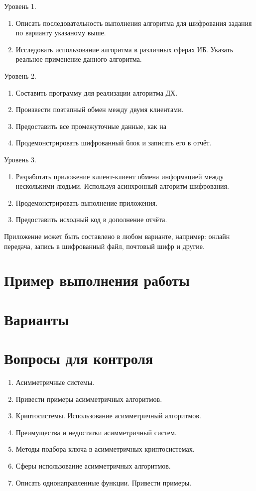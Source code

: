 \noindent Уровень 1.

\begin{enumerate}
    \item Описать последовательность выполнения алгоритма для шифрования
        задания по варианту указаному выше.
  \item Исследовать использование алгоритма в различных сферах ИБ. Указать
      реальное применение данного алгоритма.
\end{enumerate}

\noindent Уровень 2.

\begin{enumerate}
  \item Составить программу для реализации алгоритма ДХ.
  \item Произвести поэтапный обмен между двумя клиентами.
  \item Предоставить все промежуточные данные, как на 
  \item Продемонстрировать шифрованный блок и записать его в отчёт.
\end{enumerate}

\noindent Уровень 3.

\begin{enumerate}
  \item Разработать приложение клиент-клиент обмена информацией между
      несколькими людьми. Используя асинхронный алгоритм шифрования.
  \item Продемонстрировать выполнение приложения.
  \item Предоставить исходный код в дополнение отчёта.
\end{enumerate}
Приложение может быть составлено в любом варианте, например: онлайн передача,
запись в шифрованный файл, почтовый шифр и другие.
\section{Пример выполнения работы}\label{sect2_c}
%
\section{Варианты}\label{sect2_d}
%
\section{Вопросы для контроля}\label{sect2_e}
\begin{enumerate}
  \item Асимметричные системы.
  \item Привести примеры асимметричных алгоритмов.
  \item Криптосистемы. Использование асимметричный алгоритмов.
  \item Преимущества и недостатки асимметричный систем.
  \item Методы подбора ключа в асимметричных криптосистемах.
  \item Сферы использование асимметричных алгоритмов.
  \item Описать однонаправленные функции. Привести примеры.
\end{enumerate}
%
